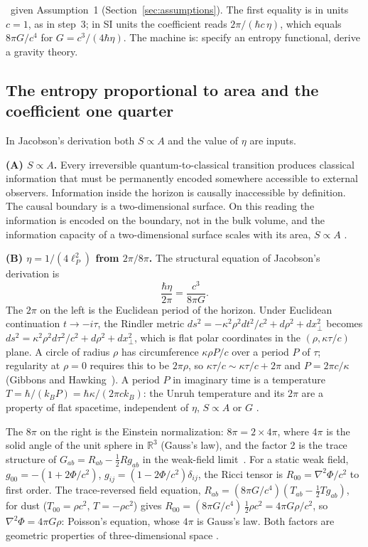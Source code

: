 \derived\ given Assumption~1 (Section~\ref{sec:assumptions}). The first equality is in units $c=1$, as in step~3; in SI units the coefficient reads $2\pi/(\hbar c\,\eta)$, which equals $8\pi G/c^4$ for $G=c^3/(4\hbar\eta)$. The machine is: specify an entropy functional, derive a gravity theory.

\subsection{The entropy proportional to area and the coefficient one quarter}
In Jacobson's derivation both $S\propto A$ and the value of $\eta$ are inputs.

\textbf{(A) $S\propto A$.} Every irreversible quantum-to-classical transition produces classical information that must be permanently encoded somewhere
accessible to external observers. Information inside the horizon is causally inaccessible by definition. The causal boundary is a two-dimensional surface.
On this reading the information is encoded on the boundary, not in the bulk volume, and the information capacity of a two-dimensional surface scales with
its area, $S\propto A$ \interp.

\textbf{(B) $\eta=1/(4\ell_P^2)$ from $2\pi/8\pi$.} The structural equation of Jacobson's derivation is
\begin{equation}
\frac{\hbar\eta}{2\pi}=\frac{c^3}{8\pi G}. \label{eq:law_structure}
\end{equation}
The $2\pi$ on the left is the Euclidean period of the horizon. Under Euclidean continuation $t\to-i\tau$, the Rindler metric
$ds^2=-\kappa^2\rho^2dt^2/c^2+d\rho^2+dx_\perp^2$ becomes $ds^2=\kappa^2\rho^2d\tau^2/c^2+d\rho^2+dx_\perp^2$, which is flat polar coordinates in the
$(\rho,\kappa\tau/c)$ plane. A circle of radius $\rho$ has circumference $\kappa\rho P/c$ over a period $P$ of $\tau$; regularity at $\rho=0$ requires this to be
$2\pi\rho$, so $\kappa\tau/c\sim\kappa\tau/c+2\pi$ and $P=2\pi c/\kappa$ (Gibbons and Hawking~\cite{GibbonsHawking1977b}). A period $P$ in imaginary time is a
temperature $T=\hbar/(k_BP)=\hbar\kappa/(2\pi ck_B)$: the Unruh temperature and its $2\pi$ are a property of flat spacetime, independent of $\eta$,
$S\propto A$ or $G$ \derived.

The $8\pi$ on the right is the Einstein normalization: $8\pi=2\times4\pi$, where $4\pi$ is the solid angle of the unit sphere in $\mathbb R^3$ (Gauss's
law), and the factor 2 is the trace structure of $G_{ab}=R_{ab}-\tfrac12Rg_{ab}$ in the weak-field limit~\cite{Wald1984}. For a static weak field,
$g_{00}=-(1+2\Phi/c^2)$, $g_{ij}=(1-2\Phi/c^2)\delta_{ij}$, the Ricci tensor is $R_{00}=\nabla^2\Phi/c^2$ to first order. The trace-reversed field equation,
$R_{ab}=(8\pi G/c^4)(T_{ab}-\tfrac12Tg_{ab})$, for dust ($T_{00}=\rho c^2$, $T=-\rho c^2$) gives $R_{00}=(8\pi G/c^4)\,\tfrac12\rho c^2=4\pi G\rho/c^2$, so
$\nabla^2\Phi=4\pi G\rho$: Poisson's equation, whose $4\pi$ is Gauss's law. Both factors are geometric properties of three-dimensional space \derived.


